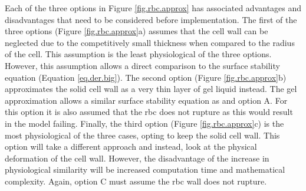\noindent Each of the three options in Figure \ref{fig.rbc.approx} has associated advantages and disadvantages that need to be considered before implementation. The first of the three options (Figure \ref{fig.rbc.approx}a) assumes that the cell wall can be neglected due to the competitively small thickness when compared to the radius of the cell. This assumption is the least physiological of the three options. However, this assumption allows a direct comparison to the surface stability equation (Equation \ref{eq.der.big}). The second option (Figure \ref{fig.rbc.approx}b) approximates the solid cell wall as a very thin layer of gel liquid instead. The gel approximation allows a similar surface stability equation as \cite{Prosperetti1974,Zeng2018} and option A. For this option it is also assumed that the \ac{rbc} does not rupture as this would result in the model failing. Finally, the third option (Figure \ref{fig.rbc.approx}c) is the most physiological of the three cases, opting to keep the solid cell wall. This option will take a different approach and instead, look at the physical deformation of the cell wall.  However, the disadvantage of the increase in physiological similarity will be increased computation time and mathematical complexity. Again, option C must assume the \ac{rbc} wall does not rupture. 

